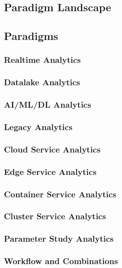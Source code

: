 \documentclass[12pt]{article}
\begin{document}
\subsection{Paradigm Landscape}

\subsection{Paradigms}
\subsubsection{Realtime Analytics} 
\subsubsection{Datalake Analytics} 
\subsubsection{AI/ML/DL  Analytics} 
\subsubsection{Legacy Analytics}
\subsubsection{Cloud Service Analytics}

\subsubsection{Edge Service Analytics}
\subsubsection{Container Service Analytics}
\subsubsection{Cluster Service Analytics}
\subsubsection{Parameter Study Analytics}
\subsubsection{Workflow and Combinations}
\end{document}
